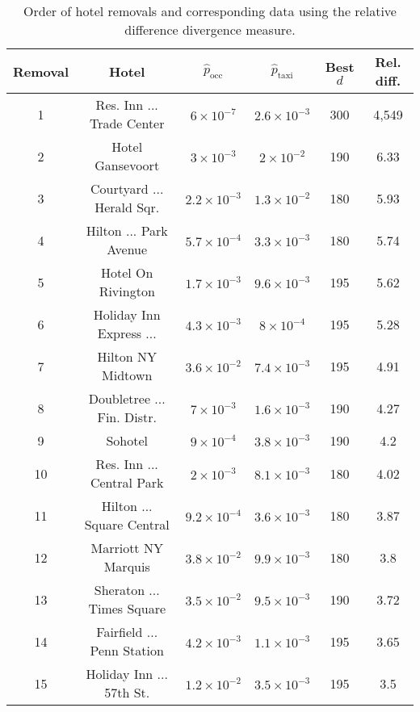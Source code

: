 \documentclass[useAMS, usenatbib]{biom}
\begin{document}
\begin{table}
\caption{Order of hotel removals and corresponding data using the relative difference divergence measure.}
\label{t:relative_divergence}
\begin{center}
\resizebox{\columnwidth}{!}
{
 \begin{tabular}{||c|c|c|c|c|c||}
 \hline
 Removal & Hotel & $\hat{p}_{\mathrm{occ}}$ & $\hat{p}_{\mathrm{taxi}}$ & Best $d$ & Rel. diff. \\ [0.5ex] 
 \hline
 1 & Res. Inn ... Trade Center & $6 \times 10^{-7}$ & $2.6 \times 10^{-3}$ & 300 & 4,549 \\
 2 & Hotel Gansevoort & $3 \times 10^{-3}$ & $2 \times 10^{-2}$ & 190 & 6.33 \\
 3 & Courtyard ... Herald Sqr. & $2.2 \times 10^{-3}$ & $1.3 \times 10^{-2}$ & 180 & 5.93 \\
 4 & Hilton ... Park Avenue & $5.7 \times 10^{-4}$ & $3.3 \times 10^{-3}$ & 180 & 5.74 \\
 5 & Hotel On Rivington & $1.7 \times 10^{-3}$ & $9.6 \times 10^{-3}$ & 195 & 5.62 \\
 6 & Holiday Inn Express ... & $4.3 \times 10^{-3}$ & $8 \times 10^{-4}$ & 195 & 5.28 \\
 7 & Hilton NY Midtown & $3.6 \times 10^{-2}$ & $7.4 \times 10^{-3}$ & 195 & 4.91 \\
 8 & Doubletree ... Fin. Distr. & $7 \times 10^{-3}$ & $1.6 \times 10^{-3}$ & 190 & 4.27 \\
 9 & Sohotel & $9 \times 10^{-4}$ & $3.8 \times 10^{-3}$ & 190 & 4.2 \\
 10 & Res. Inn ... Central Park & $2 \times 10^{-3}$ & $8.1 \times 10^{-3}$ & 180 & 4.02 \\
 11 & Hilton ... Square Central & $9.2 \times 10^{-4} $ & $3.6 \times 10^{-3}$ & 180 & 3.87 \\
 12 & Marriott NY Marquis & $3.8 \times 10^{-2}$ & $9.9 \times 10^{-3}$ & 180 & 3.8 \\
 13 & Sheraton ... Times Square & $3.5 \times 10^{-2}$ & $9.5 \times 10^{-3}$ & 190 & 3.72 \\
 14 & Fairfield ... Penn Station & $4.2 \times 10^{-3}$ & $1.1 \times 10^{-3}$ & 195 & 3.65 \\
 15 & Holiday Inn ... 57th St. & $1.2 \times 10^{-2}$ & $3.5 \times 10^{-3}$ & 195 & 3.5 \\
 \hline
\end{tabular}
}
\end{center}
\end{table}
\end{document}
